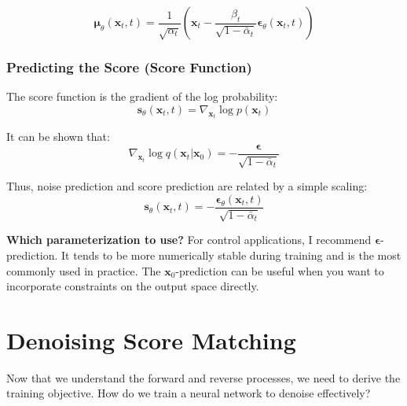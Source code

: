 \begin{equation}
\boldsymbol{\mu}_\theta(\mathbf{x}_t, t) = \frac{1}{\sqrt{\alpha_t}}\left(\mathbf{x}_t - \frac{\beta_t}{\sqrt{1-\bar{\alpha}_t}}\boldsymbol{\epsilon}_\theta(\mathbf{x}_t, t)\right)
\label{eq:mu_eps_param}
\end{equation}

\subsubsection{Predicting the Score (Score Function)}

The score function is the gradient of the log probability:
\begin{equation}
\mathbf{s}_\theta(\mathbf{x}_t, t) = \nabla_{\mathbf{x}_t} \log p(\mathbf{x}_t)
\label{eq:score_definition}
\end{equation}

It can be shown that:
\begin{equation}
\nabla_{\mathbf{x}_t} \log q(\mathbf{x}_t | \mathbf{x}_0) = -\frac{\boldsymbol{\epsilon}}{\sqrt{1-\bar{\alpha}_t}}
\label{eq:score_noise_relation}
\end{equation}

Thus, noise prediction and score prediction are related by a simple scaling:
\begin{equation}
\mathbf{s}_\theta(\mathbf{x}_t, t) = -\frac{\boldsymbol{\epsilon}_\theta(\mathbf{x}_t, t)}{\sqrt{1-\bar{\alpha}_t}}
\label{eq:score_eps_relation}
\end{equation}

\textbf{Which parameterization to use?} For control applications, I recommend $\boldsymbol{\epsilon}$-prediction. It tends to be more numerically stable during training and is the most commonly used in practice. The $\mathbf{x}_0$-prediction can be useful when you want to incorporate constraints on the output space directly.

\section{Denoising Score Matching}
\label{sec:score_matching}

Now that we understand the forward and reverse processes, we need to derive the training objective. How do we train a neural network to denoise effectively?


